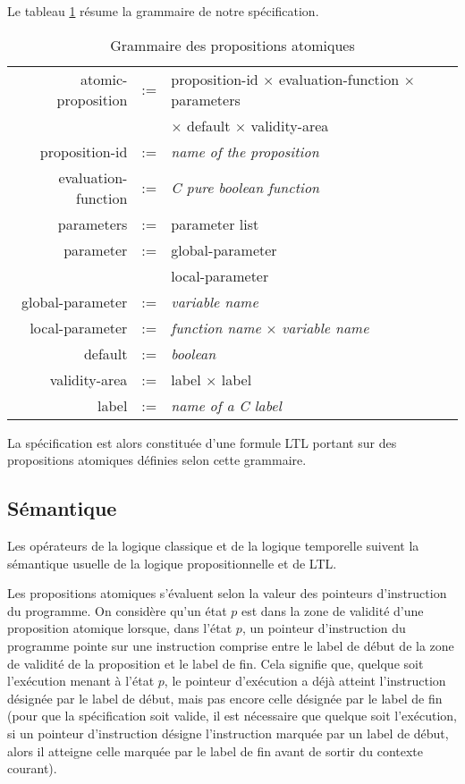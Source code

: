 Le tableau \ref{tab:spe_gram} résume la grammaire de notre spécification.

\begin{table}[h]
\centering
\caption{Grammaire des propositions atomiques}
\label{tab:spe_gram}
\begin{tabular}[]{@{}rcl@{}}
\hline
atomic-proposition  & := & proposition-id \(\times\) evaluation-function \(\times\) parameters\\
                    &    & \(\times\) default \(\times\) validity-area\\
proposition-id      & := & \emph{name of the proposition}\\
evaluation-function & := & \emph{C pure boolean function}\\
parameters          & := & parameter list\\
parameter           & := & global-parameter\\
                    & \textbar{} & local-parameter\\
global-parameter    & := & \emph{variable name}\\
local-parameter     & := & \emph{function name} \(\times\) \emph{variable name}\\
default             & := & \emph{boolean}\\
validity-area       & := & label \(\times\) label\\
label               & := & \emph{name of a C label}\\
\hline
\end{tabular}
\end{table}

La spécification est alors constituée d'une formule LTL portant sur des
propositions atomiques définies selon cette grammaire.

\subsection{Sémantique}

Les opérateurs de la logique classique et de la logique temporelle
suivent la sémantique usuelle de la logique propositionnelle et de LTL.

Les propositions atomiques s'évaluent selon la valeur des pointeurs
d'instruction du programme. On considère qu'un état \(p\) est dans la zone de
validité d'une proposition atomique lorsque, dans l'état \(p\), un pointeur
d'instruction du programme pointe sur une instruction comprise entre le label de
début de la zone de validité de la proposition et le label de fin. Cela signifie
que, quelque soit l'exécution menant à l'état \(p\), le pointeur d'exécution a
déjà atteint l'instruction désignée par le label de début, mais pas encore celle
désignée par le label de fin (pour que la spécification soit valide, il est
nécessaire que quelque soit l'exécution, si un pointeur d'instruction désigne
l'instruction marquée par un label de début, alors il atteigne celle marquée par
le label de fin avant de sortir du contexte courant).

